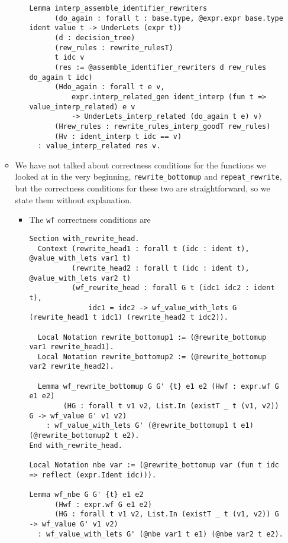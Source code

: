\begin{itemize}
\begin{itemize}
\begin{itemize}
\begin{verbatim}
Lemma interp_assemble_identifier_rewriters
      (do_again : forall t : base.type, @expr.expr base.type ident value t -> UnderLets (expr t))
      (d : decision_tree)
      (rew_rules : rewrite_rulesT)
      t idc v
      (res := @assemble_identifier_rewriters d rew_rules do_again t idc)
      (Hdo_again : forall t e v,
          expr.interp_related_gen ident_interp (fun t => value_interp_related) e v
          -> UnderLets_interp_related (do_again t e) v)
      (Hrew_rules : rewrite_rules_interp_goodT rew_rules)
      (Hv : ident_interp t idc == v)
  : value_interp_related res v.
\end{verbatim}
    \end{itemize}
  \item
    We have not talked about correctness conditions for the functions we
    looked at in the very beginning, \texttt{rewrite\_bottomup} and
    \texttt{repeat\_rewrite}, but the correctness conditions for these
    two are straightforward, so we state them without explanation.

    \begin{itemize}
    \item
      The \texttt{wf} correctness conditions are

\begin{verbatim}
Section with_rewrite_head.
  Context (rewrite_head1 : forall t (idc : ident t), @value_with_lets var1 t)
          (rewrite_head2 : forall t (idc : ident t), @value_with_lets var2 t)
          (wf_rewrite_head : forall G t (idc1 idc2 : ident t),
              idc1 = idc2 -> wf_value_with_lets G (rewrite_head1 t idc1) (rewrite_head2 t idc2)).

  Local Notation rewrite_bottomup1 := (@rewrite_bottomup var1 rewrite_head1).
  Local Notation rewrite_bottomup2 := (@rewrite_bottomup var2 rewrite_head2).

  Lemma wf_rewrite_bottomup G G' {t} e1 e2 (Hwf : expr.wf G e1 e2)
        (HG : forall t v1 v2, List.In (existT _ t (v1, v2)) G -> wf_value G' v1 v2)
    : wf_value_with_lets G' (@rewrite_bottomup1 t e1) (@rewrite_bottomup2 t e2).
End with_rewrite_head.

Local Notation nbe var := (@rewrite_bottomup var (fun t idc => reflect (expr.Ident idc))).

Lemma wf_nbe G G' {t} e1 e2
      (Hwf : expr.wf G e1 e2)
      (HG : forall t v1 v2, List.In (existT _ t (v1, v2)) G -> wf_value G' v1 v2)
  : wf_value_with_lets G' (@nbe var1 t e1) (@nbe var2 t e2).


\end{verbatim}
\end{itemize}
\end{itemize}
\end{itemize}
